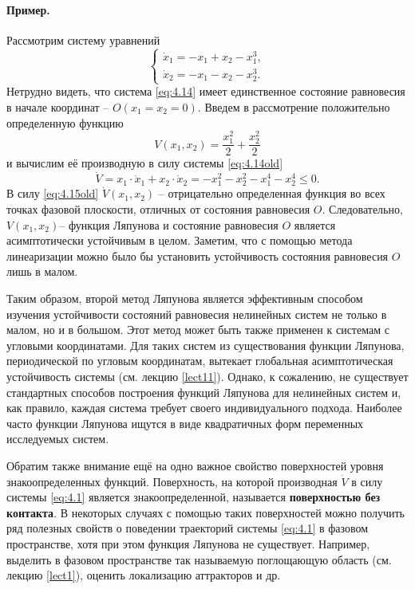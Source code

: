 \paragraph{Пример.}%
\label{par:primer_}

Рассмотрим систему уравнений
\begin{equation}
        \label{eq:4.14old}
        \begin{cases}
                \dot x_1 = -x_1+x_2- x_1^3, \\
                \dot x_2 = -x_1 - x_2 - x_2^3.
        \end{cases}
\end{equation}
Нетрудно видеть, что система \eqref{eq:4.14} имеет единственное состояние равновесия в начале координат -- $O(x_1=x_2=0)$. Введем в рассмотрение положительно определенную функцию
\begin{equation}
        \label{eq:}
        V(x_1,x_2) = \frac{x_1^2}{2} + \frac{x_2^2}{2}
\end{equation}
и вычислим её производную в силу системы \eqref{eq:4.14old}
\begin{equation}
        \label{eq:4.15old}
       \dot V = x_1 \cdot \dot x_1 + x_2 \cdot \dot x_2 = -x_1^2 - x_2^2 - x_1^4 - x_2^4 \leq 0. 
\end{equation}
В силу \eqref{eq:4.15old} $\dot V( x_1,x_2)$ -- отрицательно определенная функция во всех точках фазовой плоскости, отличных от состояния равновесия $O$. Следовательно, $V(x_1,x_2)$-- функция Ляпунова и состояние равновесия
$O$ является асимптотически устойчивым в целом.
Заметим, что с помощью метода линеаризации можно было бы установить устойчивость состояния равновесия $O$ лишь в малом.

Таким образом, второй метод Ляпунова является эффективным способом
изучения устойчивости состояний равновесия нелинейных систем не только в
малом, но и в большом. Этот метод может быть также применен к системам с
угловыми координатами. Для таких систем из существования функции
Ляпунова, периодической по угловым координатам, вытекает глобальная
асимптотическая устойчивость системы (см. лекцию \ref{lect11}). Однако, к сожалению,
не существует стандартных способов построения функций Ляпунова для
нелинейных систем и, как правило, каждая система требует своего
индивидуального подхода. Наиболее часто функции Ляпунова ищутся в виде
квадратичных форм переменных исследуемых систем.

Обратим также внимание ещё на одно важное свойство поверхностей уровня знакоопределенных функций. Поверхность, на которой производная $\dot V$ в силу системы \eqref{eq:4.1} является знакоопределенной, называется \textbf{поверхностью без контакта}.
В некоторых случаях с помощью таких поверхностей можно получить ряд полезных свойств о поведении траекторий системы \eqref{eq:4.1} в фазовом пространстве, хотя при этом функция Ляпунова не существует. Например, выделить в фазовом пространстве так называемую поглощающую область (см. лекцию \ref{lect1}), оценить локализацию аттракторов и др.


